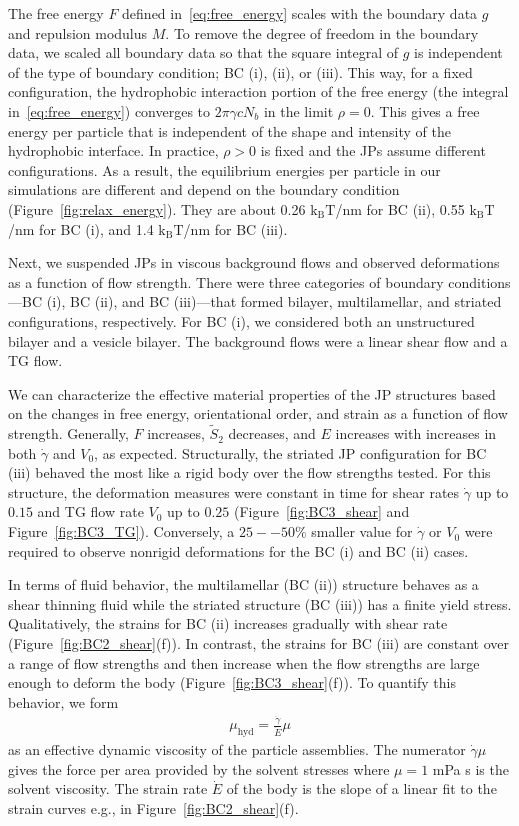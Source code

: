 \documentclass[prb,preprint,showpacs,preprintnumbers,amsmath,amssymb,longbibliography]{revtex4-1}
\begin{document}
The free energy $F$ defined in~\eqref{eq:free_energy} scales with the
boundary data $g$ and repulsion modulus $M$. To remove the degree of
freedom in the boundary data, we scaled all boundary data so that the
square integral of $g$ is independent of the type of boundary condition; BC
(i), (ii), or (iii). This way, for a fixed configuration, the
hydrophobic interaction portion of the free energy (the integral
in~\eqref{eq:free_energy}) converges to $2\pi \gamma c N_b$ in the limit
$\rho = 0$. This gives a free energy per particle that is independent of
the shape and intensity of the hydrophobic interface. In practice, $\rho
> 0$ is fixed and the JPs assume different configurations. As a result,
the equilibrium energies per particle in our simulations are different
and depend on the boundary condition (Figure~\ref{fig:relax_energy}).
They are about 0.26 $\mathrm{k_BT}$/nm for BC (ii), 0.55
$\mathrm{k_BT}$/nm for BC (i), and 1.4 $\mathrm{k_BT}$/nm for BC (iii).

Next, we suspended JPs in viscous background flows and observed
deformations as a function of flow strength. There were three categories
of boundary conditions---BC (i), BC (ii), and BC (iii)---that formed
bilayer, multilamellar, and striated configurations, respectively. For
BC (i), we considered both an unstructured bilayer and a vesicle
bilayer. The background flows were a linear shear flow and a TG flow.

We can characterize the effective material properties of the JP
structures based on the changes in free energy, orientational order, and
strain as a function of flow strength. Generally, $F$ increases, $\tilde
S_2$ decreases, and $E$ increases with increases in both $\dot \gamma$
and $V_0$, as expected. Structurally, the striated JP configuration for
BC (iii) behaved the most like a rigid body over the flow strengths
tested. For this structure, the deformation measures were constant in
time for shear rates $\dot \gamma$ up to $0.15$ and TG flow rate $V_0$
up to $0.25$ (Figure~\ref{fig:BC3_shear} and Figure~\ref{fig:BC3_TG}).
Conversely, a $25--50 \%$ smaller value for $\dot \gamma$ or $V_0$ were
required to observe nonrigid deformations for the BC (i) and BC (ii)
cases.

In terms of fluid behavior, the multilamellar (BC (ii)) structure
behaves as a shear thinning fluid while the striated structure (BC (iii))
has a finite yield stress. Qualitatively, the strains for BC (ii)
increases gradually with shear rate (Figure~\ref{fig:BC2_shear}(f)). In
contrast, the strains for BC (iii) are constant over a range of flow
strengths and then increase when the flow strengths are large enough to
deform the body (Figure~\ref{fig:BC3_shear}(f)). To quantify this
behavior, we form 
\begin{align}
\mu_{\text{hyd}} = \frac{\dot \gamma}{\dot E} \mu 
\end{align}
as an effective dynamic viscosity of the particle assemblies. The
numerator $\dot \gamma \mu$ gives the force per area provided by the
solvent stresses where $\mu = 1$ mPa s is the solvent viscosity. The
strain rate $\dot E$ of the body is the slope of a linear fit to the
strain curves e.g., in Figure~\ref{fig:BC2_shear}(f).
\end{document}
